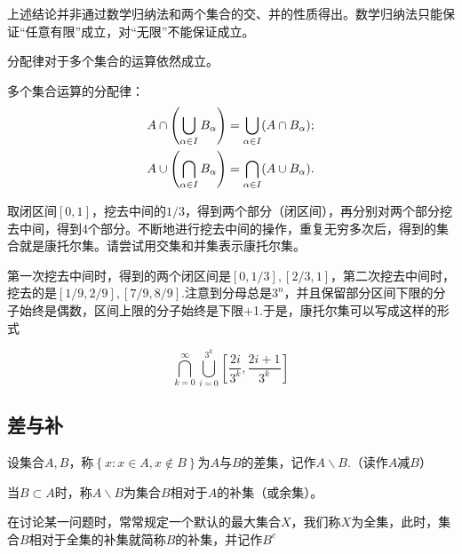 \begin{remark}
上述结论并非通过数学归纳法和两个集合的交、并的性质得出。数学归纳法只能保证“任意有限”成立，对“无限”不能保证成立。
\end{remark}

分配律对于多个集合的运算依然成立。

\begin{theorem}
    多个集合运算的分配律：
    \begin{equation}
    \begin{split}
        A\cap \left(\bigcup_{\alpha \in I} B_\alpha\right) = \bigcup_{\alpha \in I}(A\cap B_\alpha); \\
        A\cup \left(\bigcap_{\alpha \in I} B_\alpha\right) = \bigcap_{\alpha \in I}(A\cup B_\alpha).
    \end{split}
    \end{equation}
\end{theorem}

\begin{example}[康托尔集]
    取闭区间$[0,1]$，挖去中间的$1/3$，得到两个部分（闭区间），再分别对两个部分挖去中间，得到4个部分。不断地进行挖去中间的操作，重复无穷多次后，得到的集合就是康托尔集。请尝试用交集和并集表示康托尔集。
\end{example}

第一次挖去中间时，得到的两个闭区间是$\displaystyle \left[0,1/3\right],\left[2/3,1\right]$，第二次挖去中间时，挖去的是$\left[1/9,2/9\right],\left[7/9,8/9\right]$.注意到分母总是$3^n$，并且保留部分区间下限的分子始终是偶数，区间上限的分子始终是下限+1.于是，康托尔集可以写成这样的形式

\begin{equation*}
    \bigcap_{k=0}^{\infty} \bigcup_{i=0}^{3^k} \left[\frac{2i}{3^k},\frac{2i+1}{3^k}\right]
\end{equation*}

\subsection{差与补}

\begin{definition}[差集]
    设集合$A,B$，称$\left\{x:x\in A, x\notin B \right\}$为$A$与$B$的差集，记作$A\backslash B$.（读作$A$减$B$）

    当$B \subset A$时，称$A\backslash B$为集合$B$相对于$A$的补集（或余集）。
\end{definition}

在讨论某一问题时，常常规定一个默认的最大集合$X$，我们称$X$为全集，此时，集合$B$相对于全集的补集就简称$B$的补集，并记作$B^c$

